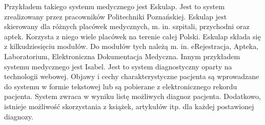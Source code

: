 \begin{spacing}{1.5}
Przykładem takiego systemu medycznego jest Eskulap. Jest to system zrealizowany przez pracowników Politechniki Poznańskiej. Eskulap jest skierowany dla różnych placówek medycznych, m. in. szpitali, przychodni oraz aptek. Korzysta z niego wiele placówek na terenie całej Polski. Eskulap składa się z kilkudziesięciu modułów. Do modułów tych należą m. in. eRejestracja, Apteka, Laboratorium, Elektroniczna Dokumentacja Medyczna. Innym przykładem systemu medycznego jest Isabel. Jest to system diagnostyczny oparty na technologii webowej. Objawy i cechy charakterystyczne pacjenta są wprowadzane do systemu w formie tekstowej lub są pobierane z elektronicznego rekordu pacjenta. System zwraca w wyniku listę możliwych diagnoz pacjenta. Dodatkowo, istnieje możliwość skorzystania z książek, artykułów itp. dla każdej postawionej diagnozy. 


\end{spacing}
